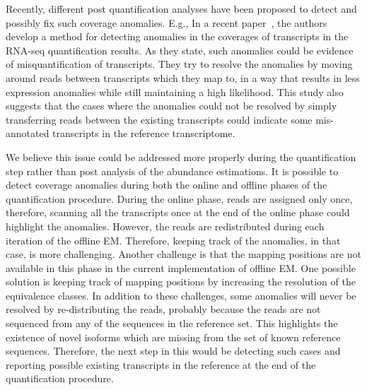 Recently, different post quantification analyses have been proposed to detect and possibly fix such
coverage anomalies. E.g., In a recent paper~\cite{ma2019detecting}, the authors develop a method for 
detecting anomalies in the coverages of transcripts in the RNA-seq quantification results. As they state, 
such anomalies could be evidence of misquantification of transcripts. They try to resolve the anomalies by 
moving around reads between transcripts which they map to, in a way that results in less expression anomalies 
while still maintaining a high likelihood. This study also suggests that the cases where the anomalies could 
not be resolved by simply transferring reads between the existing transcripts could indicate some mis-annotated 
transcripts in the reference transcriptome.


We believe this issue could be addressed more properly during the quantification step rather than post 
analysis of the abundance estimations.
It is possible to detect coverage anomalies during both the online 
and offline phases of the quantification procedure. During the online phase, reads are assigned only once, 
therefore, scanning all the transcripts once at the end of the online phase could highlight the anomalies. However, 
the reads are redistributed during each iteration of the offline EM. Therefore, keeping track of the anomalies, in that case, is more challenging. Another challenge is that the mapping positions are not available in this phase 
in the current implementation of offline EM. One possible solution is keeping track of mapping positions by 
increasing the resolution of the equivalence classes. In addition to these challenges, some anomalies will 
never be resolved by re-distributing the reads, probably because the reads are not sequenced from any of 
the sequences in the reference set. This highlights the existence of novel isoforms which are missing from 
the set of known reference sequences. Therefore, the next step in this would be detecting such cases and 
reporting possible existing transcripts in the reference at the end of the quantification procedure.

